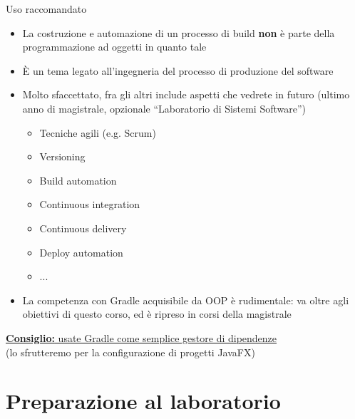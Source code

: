 \documentclass[xcolor=dvipsnames,presentation]{beamer}
\begin{document}
\begin{frame}[fragile]{Uso raccomandato}
    \begin{itemize}
        \item La costruzione e automazione di un processo di build \textbf{non} è parte della programmazione ad oggetti in quanto tale
        \item È un tema legato all'ingegneria del processo di produzione del software
        \item Molto sfaccettato, fra gli altri include aspetti che vedrete in futuro
        {\small(ultimo anno di magistrale, opzionale ``Laboratorio di Sistemi Software'')}
        \begin{itemize}
            \item Tecniche agili (e.g. Scrum)
            \item Versioning
            \item Build automation
            \item Continuous integration
            \item Continuous delivery
            \item Deploy automation
            \item ...
        \end{itemize}
        \item La competenza con Gradle acquisibile da OOP è rudimentale: va oltre agli obiettivi di questo corso, ed è ripreso in corsi della magistrale
    \end{itemize}
    \begin{center}
        \underline{\textbf{Consiglio:} usate Gradle come semplice gestore di dipendenze}\\(lo sfrutteremo per la configurazione di progetti JavaFX)
    \end{center}
\end{frame}


\section{Preparazione al laboratorio}
\end{document}
